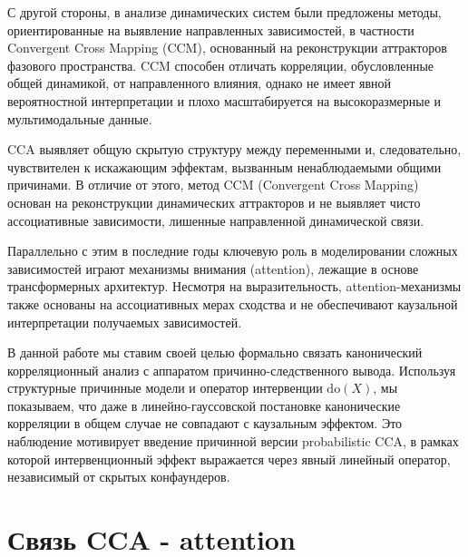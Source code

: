 \documentclass[a4paper,14pt]{article}
\theoremstyle{plain} %
\theoremstyle{definition} %
\theoremstyle{remark} %
\begin{document}
С другой стороны, в анализе динамических систем были предложены методы, ориентированные на выявление направленных зависимостей, в частности Convergent Cross Mapping (CCM), основанный на реконструкции аттракторов фазового пространства. CCM способен отличать корреляции, обусловленные общей динамикой, от направленного влияния, однако не имеет явной вероятностной интерпретации и плохо масштабируется на высокоразмерные и мультимодальные данные.

CCA выявляет общую скрытую структуру между переменными и, следовательно, чувствителен к искажающим эффектам, вызванным ненаблюдаемыми общими причинами. В отличие от этого, метод CCM (Convergent Cross Mapping) основан на реконструкции динамических аттракторов и не выявляет чисто ассоциативные зависимости, лишенные направленной динамической связи.

Параллельно с этим в последние годы ключевую роль в моделировании сложных зависимостей играют механизмы внимания (attention), лежащие в основе трансформерных архитектур. Несмотря на выразительность, attention-механизмы также основаны на ассоциативных мерах сходства и не обеспечивают каузальной интерпретации получаемых зависимостей.

В данной работе мы ставим своей целью формально связать канонический корреляционный анализ с аппаратом причинно-следственного вывода. Используя структурные причинные модели и оператор интервенции $\mathrm{do}(X)$, мы показываем, что даже в линейно-гауссовской постановке канонические корреляции в общем случае не совпадают с каузальным эффектом. Это наблюдение мотивирует введение причинной версии probabilistic CCA, в рамках которой интервенционный эффект выражается через явный линейный оператор, независимый от скрытых конфаундеров.



        \section{Связь CCA - attention}
\end{document}
